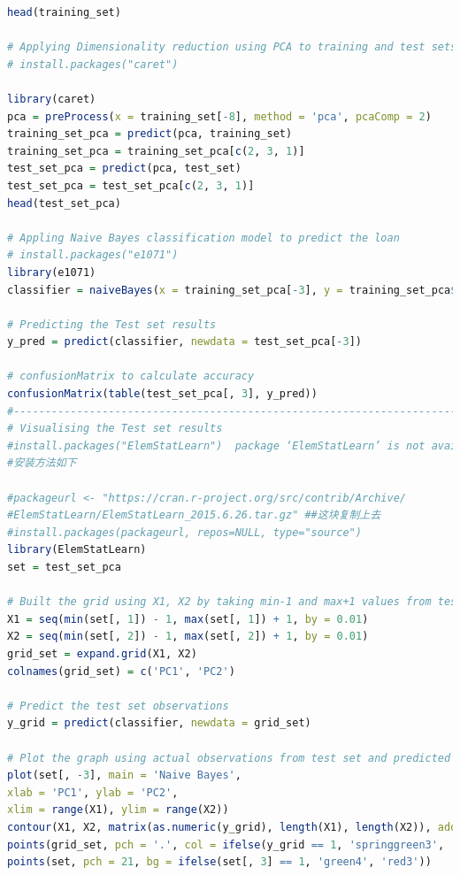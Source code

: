 \documentclass[UTF8]{ctexart}
\begin{document}
\begin{appendices}
\begin{lstlisting}[language=R]
head(training_set)

# Applying Dimensionality reduction using PCA to training and test sets
# install.packages("caret")

library(caret)
pca = preProcess(x = training_set[-8], method = 'pca', pcaComp = 2)
training_set_pca = predict(pca, training_set)
training_set_pca = training_set_pca[c(2, 3, 1)]
test_set_pca = predict(pca, test_set)
test_set_pca = test_set_pca[c(2, 3, 1)]
head(test_set_pca)

# Appling Naive Bayes classification model to predict the loan
# install.packages("e1071")
library(e1071)
classifier = naiveBayes(x = training_set_pca[-3], y = training_set_pca$loan_decision_status)

# Predicting the Test set results
y_pred = predict(classifier, newdata = test_set_pca[-3])

# confusionMatrix to calculate accuracy
confusionMatrix(table(test_set_pca[, 3], y_pred))
#--------------------------------------------------------------------------
# Visualising the Test set results
#install.packages("ElemStatLearn")  package ‘ElemStatLearn’ is not available (for R version 3.6.3)
#安装方法如下

#packageurl <- "https://cran.r-project.org/src/contrib/Archive/
#ElemStatLearn/ElemStatLearn_2015.6.26.tar.gz" ##这块复制上去
#install.packages(packageurl, repos=NULL, type="source")
library(ElemStatLearn)
set = test_set_pca

# Built the grid using X1, X2 by taking min-1 and max+1 values from test set
X1 = seq(min(set[, 1]) - 1, max(set[, 1]) + 1, by = 0.01)
X2 = seq(min(set[, 2]) - 1, max(set[, 2]) + 1, by = 0.01)
grid_set = expand.grid(X1, X2)
colnames(grid_set) = c('PC1', 'PC2')

# Predict the test set observations 
y_grid = predict(classifier, newdata = grid_set)

# Plot the graph using actual observations from test set and predicted results
plot(set[, -3], main = 'Naive Bayes',
xlab = 'PC1', ylab = 'PC2',
xlim = range(X1), ylim = range(X2))
contour(X1, X2, matrix(as.numeric(y_grid), length(X1), length(X2)), add = TRUE)
points(grid_set, pch = '.', col = ifelse(y_grid == 1, 'springgreen3', 'tomato'))
points(set, pch = 21, bg = ifelse(set[, 3] == 1, 'green4', 'red3')) 
\end{lstlisting}


\end{appendices}
	
\end{document}
